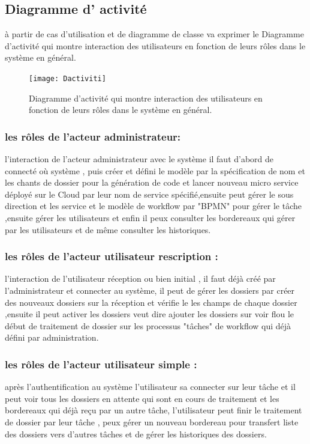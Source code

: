 \subsection{Diagramme d' activité  }

à partir de cas d'utilisation et de diagramme de classe  va exprimer  le Diagramme d'activité qui  montre interaction des  utilisateurs   en fonction de leurs rôles dans le système en général.
\begin{figure}[H]
	\centering
	\texttt{[image: Dactiviti]}
	\caption{Diagramme d'activité qui  montre interaction des  utilisateurs   en fonction de leurs rôles dans le système en général.}
	\label{fig:dactiviti}
\end{figure}
\subsubsection{les rôles de l'acteur administrateur: }
l'interaction de l'acteur administrateur avec le système il faut d'abord de connecté où système , puis créer  et  défini le modèle par la spécification de   nom et  les chants de dossier  pour la génération de code et lancer nouveau micro service déployé sur le Cloud par leur nom de service spécifié,ensuite peut gérer le sous direction et les service et le modèle de workflow par "BPMN"  pour gérer le tâche   ,ensuite   gérer les utilisateurs  et enfin  il peux consulter les bordereaux qui gérer par les utilisateurs et de même  consulter les historiques.

\subsubsection{les rôles de l'acteur utilisateur rescription : }
l'interaction de l'utilisateur réception ou bien initial , il faut déjà créé par l'administrateur  et connecter au système, il peut de  gérer les dossiers par créer des nouveaux dossiers sur la réception et vérifie le   les champs  de chaque dossier ,ensuite il peut activer les dossiers veut dire ajouter les dossiers sur voir flou le début de traitement de dossier sur les processus "tâches" de workflow qui déjà défini par administration. 

\subsubsection{les rôles de l'acteur utilisateur simple : } 
 après l'authentification au système l'utilisateur sa connecter  sur leur tâche et il peut voir tous les dossiers en attente qui sont en cours de traitement et les bordereaux qui  déjà reçu par un autre tâche, l'utilisateur peut finir le traitement de dossier par leur tâche , peux gérer un nouveau bordereau pour transfert liste des dossiers vers d'autres tâches  et de gérer les historiques des dossiers.
   
